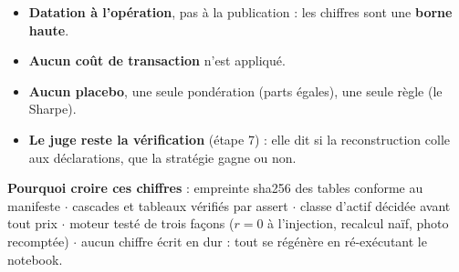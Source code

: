 \documentclass[10pt,a4paper]{article}
\newcommand{\pts}[1]{{\footnotesize\begin{itemize}#1\end{itemize}}\vspace{0.6mm}}
\begin{document}
\begin{tcolorbox}[enhanced, colback=rouge!3, colframe=rouge!45, boxrule=0.5pt, arc=2pt,
                  left=3mm, right=3mm, top=1.6mm, bottom=1.6mm,
                  colbacktitle=rouge, coltitle=white, fonttitle=\footnotesize\bfseries,
                  title={CE QUE CETTE PREMIÈRE VERSION NE DIT PAS}]
\begin{multicols}{2}
\pts{
\item \textbf{Datation à l'opération}, pas à la publication : les chiffres sont une \textbf{borne haute}.
\item \textbf{Aucun coût de transaction} n'est appliqué.
\item \textbf{Aucun placebo}, une seule pondération (parts égales), une seule règle (le Sharpe).
\item \textbf{Le juge reste la vérification} (étape 7) : elle dit si la reconstruction colle aux
déclarations, que la stratégie gagne ou non.
}
\end{multicols}
\vspace{-1mm}
{\scriptsize\color{grisf}\textbf{Pourquoi croire ces chiffres} : empreinte sha256 des tables conforme au
manifeste $\cdot$ cascades et tableaux vérifiés par assert $\cdot$ classe d'actif décidée avant tout prix
$\cdot$ moteur testé de trois façons ($r=0$ à l'injection, recalcul naïf, photo recomptée) $\cdot$ aucun
chiffre écrit en dur : tout se régénère en ré-exécutant le notebook.}
\end{tcolorbox}
\end{document}
